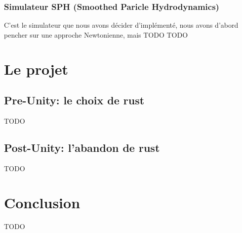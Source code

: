 \documentclass{article}
\begin{document}
\subsubsection{Simulateur SPH (Smoothed Paricle Hydrodynamics)}
C'est le simulateur que nous avons décider d'implémenté, nous avons d'abord pencher sur une approche Newtonienne, mais TODO
TODO

\section{Le projet}
\subsection{Pre-Unity: le choix de rust}
TODO
\subsection{Post-Unity: l'abandon de rust}
TODO

\section{Conclusion}
TODO
\end{document}
